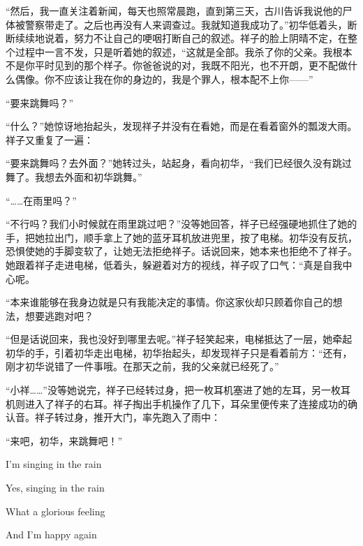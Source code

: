 \documentclass{article}
\begin{document}
\newpage



“然后，我一直关注着新闻，每天也照常晨跑，直到第三天，古川告诉我说他的尸体被警察带走了。之后也再没有人来调查过。我就知道我成功了。”初华低着头，断断续续地说着，努力不让自己的哽咽打断自己的叙述。祥子的脸上阴晴不定，在整个过程中一言不发，只是听着她的叙述，“这就是全部。我杀了你的父亲。我根本不是你平时见到的那个样子。你爸爸说的对，我既不阳光，也不开朗，更不配做什么偶像。你不应该让我在你的身边的，我是个罪人，根本配不上你——”



“要来跳舞吗？”



“什么？”她惊讶地抬起头，发现祥子并没有在看她，而是在看着窗外的瓢泼大雨。祥子又重复了一遍：



“要来跳舞吗？去外面？”她转过头，站起身，看向初华，“我们已经很久没有跳过舞了。我想去外面和初华跳舞。”



“……在雨里吗？”



“不行吗？我们小时候就在雨里跳过吧？”没等她回答，祥子已经强硬地抓住了她的手，把她拉出门，顺手拿上了她的蓝牙耳机放进兜里，按了电梯。初华没有反抗，恐惧使她的手脚变软了，让她无法拒绝祥子。话说回来，她本来也拒绝不了祥子。她跟着祥子走进电梯，低着头，躲避着对方的视线，祥子叹了口气：“真是自我中心呢。



“本来谁能够在我身边就是只有我能决定的事情。你这家伙却只顾着你自己的想法，想要逃跑对吧？



“但是话说回来，我也没好到哪里去呢。”祥子轻笑起来，电梯抵达了一层，她牵起初华的手，引着初华走出电梯，初华抬起头，却发现祥子只是看着前方：“还有，刚才初华说错了一件事哦。在那天之前，我的父亲就已经死了。”



“小祥……”没等她说完，祥子已经转过身，把一枚耳机塞进了她的左耳，另一枚耳机则进入了祥子的右耳。祥子掏出手机操作了几下，耳朵里便传来了连接成功的确认音。祥子转过身，推开大门，率先跑入了雨中：



“来吧，初华，来跳舞吧！”



I'm singing in the rain

Yes, singing in the rain

What a glorious feeling

And I'm happy again
\end{document}
